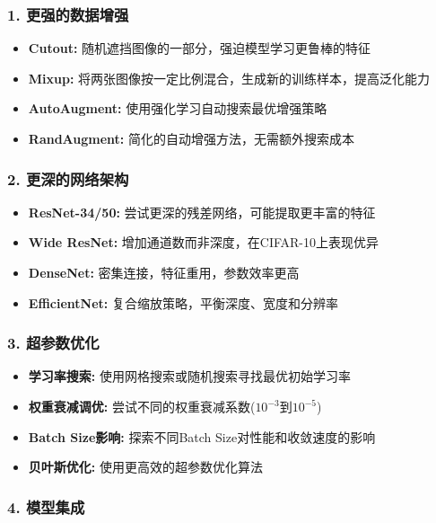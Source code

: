 \documentclass[12pt,a4paper]{article}
\begin{document}
\subsubsection{1. 更强的数据增强}

\begin{itemize}[leftmargin=2em]
    \item \textbf{Cutout:} 随机遮挡图像的一部分，强迫模型学习更鲁棒的特征
    \item \textbf{Mixup:} 将两张图像按一定比例混合，生成新的训练样本，提高泛化能力
    \item \textbf{AutoAugment:} 使用强化学习自动搜索最优增强策略
    \item \textbf{RandAugment:} 简化的自动增强方法，无需额外搜索成本
\end{itemize}

\subsubsection{2. 更深的网络架构}

\begin{itemize}[leftmargin=2em]
    \item \textbf{ResNet-34/50:} 尝试更深的残差网络，可能提取更丰富的特征
    \item \textbf{Wide ResNet:} 增加通道数而非深度，在CIFAR-10上表现优异
    \item \textbf{DenseNet:} 密集连接，特征重用，参数效率更高
    \item \textbf{EfficientNet:} 复合缩放策略，平衡深度、宽度和分辨率
\end{itemize}

\subsubsection{3. 超参数优化}

\begin{itemize}[leftmargin=2em]
    \item \textbf{学习率搜索:} 使用网格搜索或随机搜索寻找最优初始学习率
    \item \textbf{权重衰减调优:} 尝试不同的权重衰减系数($10^{-3}$到$10^{-5}$)
    \item \textbf{Batch Size影响:} 探索不同Batch Size对性能和收敛速度的影响
    \item \textbf{贝叶斯优化:} 使用更高效的超参数优化算法
\end{itemize}

\subsubsection{4. 模型集成}
\end{document}
